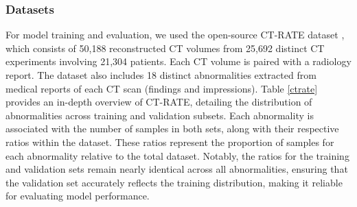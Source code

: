 

\subsubsection*{Datasets}

For model training and evaluation, we used the open-source CT-RATE dataset \cite{hamamci2024foundation}, which consists of 50,188 reconstructed CT volumes from 25,692 distinct CT experiments involving 21,304 patients. Each CT volume is paired with a radiology report. The dataset also includes 18 distinct abnormalities extracted from medical reports of each CT scan (findings and impressions). Table \ref{ctrate} provides an in-depth overview of CT-RATE, detailing the distribution of abnormalities across training and validation subsets. Each abnormality is associated with the number of samples in both sets, along with their respective ratios within the dataset. These ratios represent the proportion of samples for each abnormality relative to the total dataset. Notably, the ratios for the training and validation sets remain nearly identical across all abnormalities, ensuring that the validation set accurately reflects the training distribution, making it reliable for evaluating model performance.



